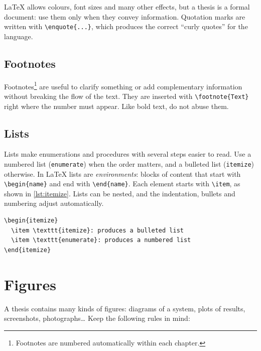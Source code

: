 \LaTeX{} allows colours, font sizes and many other effects, but a thesis is a formal
document: use them only when they convey information. Quotation marks are written with
\verb|\enquote{...}|, which produces the correct \enquote{curly quotes} for the language.

\subsection{Footnotes}\label{sec:footnotes}

Footnotes\footnote{Footnotes are numbered automatically within each chapter.} are useful to
clarify something or add complementary information without breaking the flow of the text.
They are inserted with \verb|\footnote{Text}| right where the number must appear. Like bold
text, do not abuse them.

\subsection{Lists}\label{sec:lists}

Lists make enumerations and procedures with several steps easier to read. Use a numbered
list (\texttt{enumerate}) when the order matters, and a bulleted list (\texttt{itemize})
otherwise. In \LaTeX{} lists are \emph{environments}: blocks of content that start with
\verb|\begin{name}| and end with \verb|\end{name}|. Each element starts with \verb|\item|,
as shown in \autoref{lst:itemize}. Lists can be nested, and the indentation, bullets and
numbering adjust automatically.

\begin{lstlisting}[language={[LaTeX]TeX}, caption={A bulleted list with two items.}, label=lst:itemize]
\begin{itemize}
  \item \texttt{itemize}: produces a bulleted list
  \item \texttt{enumerate}: produces a numbered list
\end{itemize}
\end{lstlisting}

\section{Figures}\label{sec:figures}

A thesis contains many kinds of figures: diagrams of a system, plots of results,
screenshots, photographs\dots{} Keep the following rules in mind:

